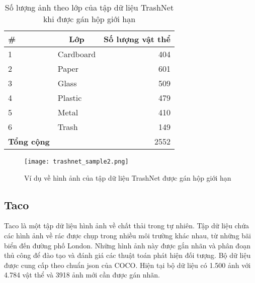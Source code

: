 \documentclass[../the.tex]{subfiles}
\begin{document}
\begin{table}[!ht]
	\centering
	\caption{Số lượng ảnh theo lớp của tập dữ liệu TrashNet khi được gán hộp giới hạn}
	\begin{tabular}{|l|l|r|}
		\hline
		\multicolumn{1}{|l|}{
			\textbf{\#}}
		 & \multicolumn{1}{c|}{\textbf{Lớp}}
		 & \multicolumn{1}{c|}{\textbf{Số lượng vật thể}} \\
		\hline

		1
		 & Cardboard
		 & 404                                            \\
		\hline

		2
		 & Paper
		 & 601                                            \\
		\hline

		3
		 & Glass
		 & 509                                            \\
		\hline

		4
		 & Plastic
		 & 479                                            \\
		\hline

		5
		 & Metal
		 & 410                                            \\
		\hline

		6
		 & Trash
		 & 149                                            \\
		\hline


		\textbf{Tổng cộng}
		 &
		 & 2552                                           \\
		\hline
	\end{tabular}

	\label{tab:dataset1}
\end{table}

\begin{figure}[H]
	\centering
	\texttt{[image: trashnet\_sample2.png]}
	\caption{Ví dụ về hình ảnh của tập dữ liệu TrashNet được gán hộp giới hạn}
	\label{fig:dataset_1}
\end{figure}

\subsection{Taco}
\label{sec:Taco}
{\fontsize{13}{12} \selectfont

	Taco là một tập dữ liệu hình ảnh về chất thải trong tự nhiên. Tập dữ liệu chứa các hình ảnh về rác được chụp trong nhiều môi trường khác nhau, từ những bãi biển đến đường phố London. Những hình ảnh này được gắn nhãn và phân đoạn thủ công để đào tạo và đánh giá các thuật toán phát hiện đối tượng.
	Bộ dữ liệu được cung cấp
	theo chuẩn json của COCO. Hiện tại bộ dữ liệu có 1.500 ảnh với 4.784 vật thể
	và 3918 ảnh mới cần được gán nhãn.

}
\end{document}
